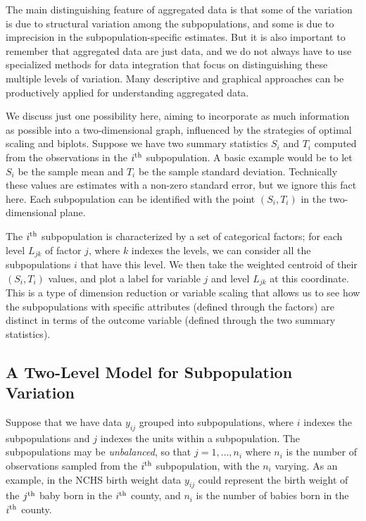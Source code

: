 The main distinguishing feature of aggregated data is that some of the variation is due to structural variation among the subpopulations, and some is due to imprecision in the subpopulation-specific estimates. But it is also important to remember that aggregated data are just data, and we do not always have to use specialized methods for data integration that focus on distinguishing these multiple levels of variation. Many descriptive and graphical approaches can be productively applied for understanding aggregated data.

We discuss just one possibility here, aiming to incorporate as much information as possible into a two-dimensional graph, influenced by the strategies of optimal scaling and biplots. Suppose we have two summary statistics $S_i$ and $T_i$ computed from the observations in the $i^{\rm th}$ subpopulation. A basic example would be to let $S_i$ be the sample mean and $T_i$ be the sample standard deviation. Technically these values are estimates with a non-zero standard error, but we ignore this fact here. Each subpopulation can be identified with the point $(S_i, T_i)$ in the two-dimensional plane.

The $i^{\rm th}$ subpopulation is characterized by a set of categorical factors; for each level $L_{jk}$ of factor $j$, where $k$ indexes the levels, we can consider all the subpopulations $i$ that have this level.  We then take the weighted centroid of their $(S_i, T_i)$ values, and plot a label for variable $j$ and level $L_{jk}$ at this coordinate. This is a type of dimension reduction or variable scaling that allows us to see how the subpopulations with specific attributes (defined through the factors) are distinct in terms of the outcome variable (defined through the two summary statistics).

\subsection{A Two-Level Model for Subpopulation Variation}

Suppose that we have data $y_{ij}$ grouped into subpopulations, where $i$ indexes the subpopulations and $j$ indexes the units within a subpopulation. The subpopulations may be {\em unbalanced}, so that $j=1, \ldots, n_i$ where $n_i$ is the number of observations sampled from the $i^{\rm th}$ subpopulation, with the $n_i$ varying. As an example, in the NCHS birth weight data $y_{ij}$ could represent the birth weight of the $j^{\rm th}$ baby born in the $i^{\rm th}$ county, and $n_i$ is the number of babies born in the $i^{\rm th}$ county.

